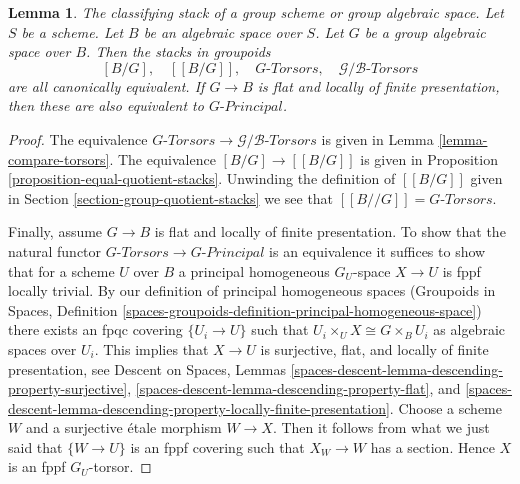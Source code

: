 \documentclass{stacks-project}
\newenvironment{slogan}{\comment}{\endcomment}
\theoremstyle{plain}
\newtheorem{lemma}[subsection]{Lemma}
\theoremstyle{definition}
\theoremstyle{remark}
\numberwithin{equation}{subsection}
\begin{document}
\begin{lemma}
\label{lemma-classifying-stacks}
\begin{slogan}
The classifying stack of a group scheme or group algebraic space.
\end{slogan}
Let $S$ be a scheme. Let $B$ be an algebraic space over $S$.
Let $G$ be a group algebraic space over $B$. Then the stacks
in groupoids
$$
[B/G],\quad
[[B/G]],\quad
G\textit{-Torsors},\quad
\mathcal{G}/\mathcal{B}\textit{-Torsors}
$$
are all canonically equivalent.
If $G \to B$ is flat and locally
of finite presentation, then these are also equivalent to
$G\textit{-Principal}$.
\end{lemma}

\begin{proof}
The equivalence
$G\textit{-Torsors} \to \mathcal{G}/\mathcal{B}\textit{-Torsors}$
is given in Lemma \ref{lemma-compare-torsors}.
The equivalence $[B/G] \to [[B/G]]$ is given in
Proposition \ref{proposition-equal-quotient-stacks}.
Unwinding the definition of $[[B/G]]$ given in
Section \ref{section-group-quotient-stacks}
we see that $[[B//G]] = G\textit{-Torsors}$.

\medskip\noindent
Finally, assume $G \to B$ is flat and locally of finite presentation.
To show that the natural functor
$G\textit{-Torsors} \to G\textit{-Principal}$ is an equivalence
it suffices to show that for a scheme $U$ over $B$
a principal homogeneous $G_U$-space $X \to U$
is fppf locally trivial. By our definition of principal homogeneous spaces
(Groupoids in Spaces,
Definition \ref{spaces-groupoids-definition-principal-homogeneous-space})
there exists an fpqc covering $\{U_i \to U\}$ such that
$U_i \times_U X \cong G \times_B U_i$ as algebraic spaces over $U_i$.
This implies that $X \to U$ is surjective, flat, and locally of finite
presentation, see
Descent on Spaces, Lemmas
\ref{spaces-descent-lemma-descending-property-surjective},
\ref{spaces-descent-lemma-descending-property-flat}, and
\ref{spaces-descent-lemma-descending-property-locally-finite-presentation}.
Choose a scheme $W$ and a surjective \'etale morphism $W \to X$.
Then it follows from what we just said that $\{W \to U\}$ is an fppf covering
such that $X_W \to W$ has a section. Hence $X$ is an fppf $G_U$-torsor.
\end{proof}
\end{document}
